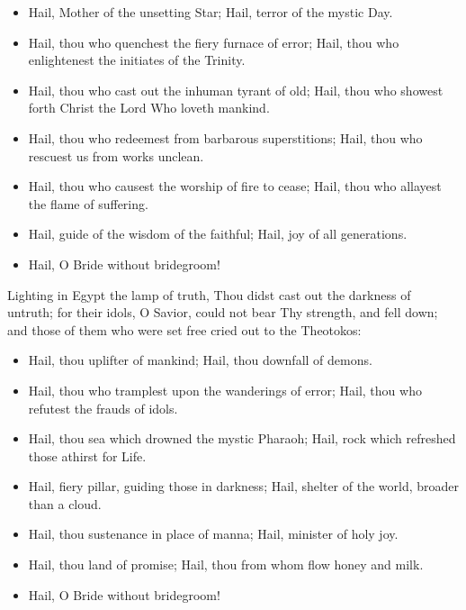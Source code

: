 \documentclass[twoside, letterpaper, 12pt]{report}
\begin{document}
\begin{itemize}[label=\tiny{+},leftmargin=*]
\item Hail, Mother of the unsetting Star;
      Hail, terror of the mystic Day.
\item Hail, thou who quenchest the fiery furnace of error;
      Hail, thou who enlightenest the initiates of the Trinity.
\item Hail, thou who cast out the inhuman tyrant of old;
      Hail, thou who showest forth Christ the Lord Who loveth mankind.
\item Hail, thou who redeemest from barbarous superstitions;
      Hail, thou who rescuest us from works unclean.
\item Hail, thou who causest the worship of fire to cease;
      Hail, thou who allayest the flame of suffering.
\item Hail, guide of the wisdom of the faithful;
      Hail, joy of all generations.
\item Hail, O Bride without bridegroom! 
\end{itemize}






\begin{priest}
  \item Lighting in Egypt the lamp of truth, Thou didst cast out the darkness of untruth;
  for their idols, O Savior, could not bear Thy strength, and fell down; and those of them
  who were set free cried out to the Theotokos:
\end{priest}

\begin{itemize}[label=\tiny{+},leftmargin=*]
\item Hail, thou uplifter of mankind;
      Hail, thou downfall of demons.
\item Hail, thou who tramplest upon the wanderings of error;
      Hail, thou who refutest the frauds of idols.
\item Hail, thou sea which drowned the mystic Pharaoh;
      Hail, rock which refreshed those athirst for Life.
\item Hail, fiery pillar, guiding those in darkness;
      Hail, shelter of the world, broader than a cloud.
\item Hail, thou sustenance in place of manna;
      Hail, minister of holy joy.
\item Hail, thou land of promise;
      Hail, thou from whom flow honey and milk. 
\item Hail, O Bride without bridegroom! 
\end{itemize}
\end{document}
